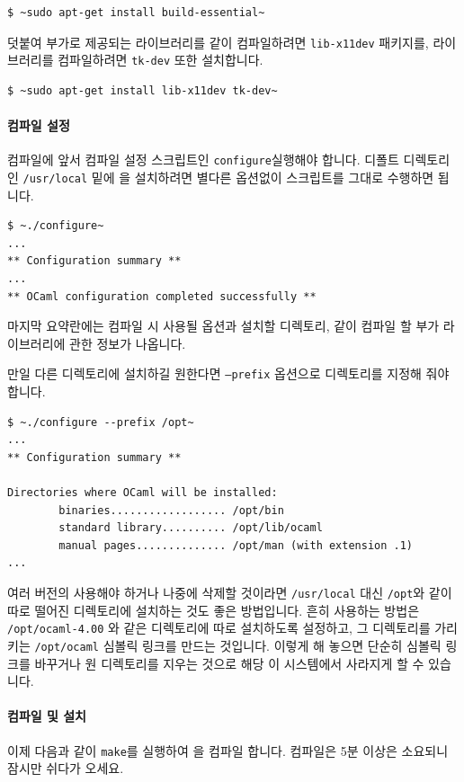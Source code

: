 \begin{lstlisting}
$ ~sudo apt-get install build-essential~
\end{lstlisting}

덧붙여 부가로 제공되는 \GRAPHICS{} 라이브러리를 같이 컴파일하려면
\texttt{lib-x11dev} 패키지를, \LABLTK{} 라이브러리를 컴파일하려면 \texttt{tk-dev}
또한 설치합니다.

\begin{lstlisting}
$ ~sudo apt-get install lib-x11dev tk-dev~
\end{lstlisting}

\paragraph{컴파일 설정} 컴파일에 앞서 컴파일 설정 스크립트인
\texttt{configure}\를 실행해야 합니다. 디폴트 디렉토리인 \texttt{/usr/local}
밑에 \OCAML{}을 설치하려면 별다른 옵션없이 스크립트를 그대로 수행하면 됩니다.

\begin{lstlisting}
$ ~./configure~
...
** Configuration summary **
...
** OCaml configuration completed successfully **
\end{lstlisting}

마지막 요약란에는 컴파일 시 사용될 옵션과 설치할 디렉토리, 같이 컴파일 할 부가
라이브러리에 관한 정보가 나옵니다.

만일 다른 디렉토리에 설치하길 원한다면 \texttt{--prefix} 옵션으로 디렉토리를
지정해 줘야 합니다.

\begin{lstlisting}
$ ~./configure --prefix /opt~
...
** Configuration summary **

Directories where OCaml will be installed:
        binaries.................. /opt/bin
        standard library.......... /opt/lib/ocaml
        manual pages.............. /opt/man (with extension .1)
...
\end{lstlisting}

여러 버전의 \OCAML{}\을 사용해야 하거나 나중에 \OCAML{}\을 삭제할 것이라면
\texttt{/usr/local} 대신 \texttt{/opt}와 같이 따로 떨어진 디렉토리에 설치하는
것도 좋은 방법입니다. 흔히 사용하는 방법은 \texttt{/opt/ocaml-4.00} 와 같은
디렉토리에 따로 설치하도록 설정하고, 그 디렉토리를 가리키는
\texttt{/opt/ocaml} 심볼릭 링크를 만드는 것입니다. 이렇게 해 놓으면 단순히
심볼릭 링크를 바꾸거나 원 디렉토리를 지우는 것으로 해당 \OCAML{}이 시스템에서
사라지게 할 수 있습니다.

\paragraph{컴파일 및 설치} 이제 다음과 같이 \texttt{make}를 실행하여
\OCAML{}을 컴파일 합니다. 컴파일은 5분 이상은 소요되니 잠시만 쉬다가 오세요.

